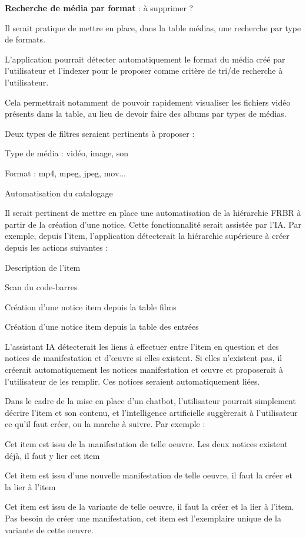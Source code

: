 \textbf{Recherche de média par format} : à supprimer ?

Il serait pratique de mettre en place, dans la table médias, une recherche par type de formats.  

L'application pourrait détecter automatiquement le format du média créé par l’utilisateur et l'indexer pour le proposer comme critère de tri/de recherche à l’utilisateur.  

Cela permettrait notamment de pouvoir rapidement visualiser les fichiers vidéo présents dans la table, au lieu de devoir faire des albums par types de médias.  

Deux types de filtres seraient pertinents à proposer :  

Type de média : vidéo, image, son 

Format : mp4, mpeg, jpeg, mov... 

\textbf{}Automatisation du catalogage 

Il serait pertinent de mettre en place une automatisation de la hiérarchie FRBR à partir de la création d’une notice. Cette fonctionnalité serait assistée par l’IA. Par exemple, depuis l’item, l’application détecterait la hiérarchie supérieure à créer depuis les actions suivantes :  

Description de l’item 

Scan du code-barres  

Création d’une notice item depuis la table films 

Création d’une notice item depuis la table des entrées  

L’assistant IA détecterait les liens à effectuer entre l’item en question et des notices de manifestation et d’œuvre si elles existent. Si elles n’existent pas, il créerait automatiquement les notices manifestation et œuvre et proposerait à l’utilisateur de les remplir. Ces notices seraient automatiquement liées. 

Dans le cadre de la mise en place d’un chatbot, l’utilisateur pourrait simplement décrire l’item et son contenu, et l’intelligence artificielle suggèrerait à l’utilisateur ce qu’il faut créer, ou la marche à suivre. Par exemple :  

Cet item est issu de la manifestation de telle oeuvre. Les deux notices existent déjà, il faut y lier cet item 

Cet item est issu d’une nouvelle manifestation de telle oeuvre, il faut la créer et la lier à l’item 

Cet item est issu de la variante de telle oeuvre, il faut la créer et la lier à l’item. Pas besoin de créer une manifestation, cet item est l’exemplaire unique de la variante de cette oeuvre.  
